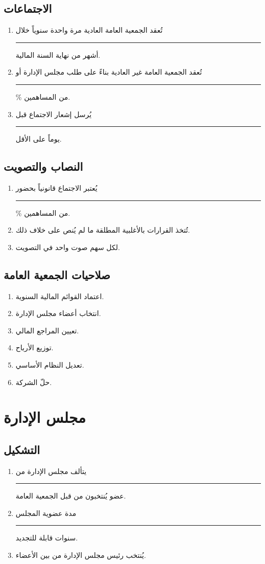 \documentclass[12pt,a4paper]{article}
\begin{document}
\subsection{الاجتماعات}
\begin{enumerate}
    \item تُعقد الجمعية العامة العادية مرة واحدة سنوياً خلال \rule{2cm}{0.4pt} أشهر من نهاية السنة المالية.
    \item تُعقد الجمعية العامة غير العادية بناءً على طلب مجلس الإدارة أو \rule{2cm}{0.4pt}\% من المساهمين.
    \item يُرسل إشعار الاجتماع قبل \rule{2cm}{0.4pt} يوماً على الأقل.
\end{enumerate}

\subsection{النصاب والتصويت}
\begin{enumerate}
    \item يُعتبر الاجتماع قانونياً بحضور \rule{2cm}{0.4pt}\% من المساهمين.
    \item تُتخذ القرارات بالأغلبية المطلقة ما لم يُنص على خلاف ذلك.
    \item لكل سهم صوت واحد في التصويت.
\end{enumerate}

\subsection{صلاحيات الجمعية العامة}
\begin{enumerate}
    \item اعتماد القوائم المالية السنوية.
    \item انتخاب أعضاء مجلس الإدارة.
    \item تعيين المراجع المالي.
    \item توزيع الأرباح.
    \item تعديل النظام الأساسي.
    \item حلّ الشركة.
\end{enumerate}

\section{مجلس الإدارة}
\label{ch:board}

\subsection{التشكيل}
\begin{enumerate}
    \item يتألف مجلس الإدارة من \rule{2cm}{0.4pt} عضو يُنتخبون من قبل الجمعية العامة.
    \item مدة عضوية المجلس \rule{2cm}{0.4pt} سنوات قابلة للتجديد.
    \item يُنتخب رئيس مجلس الإدارة من بين الأعضاء.
\end{enumerate}
\end{document}
